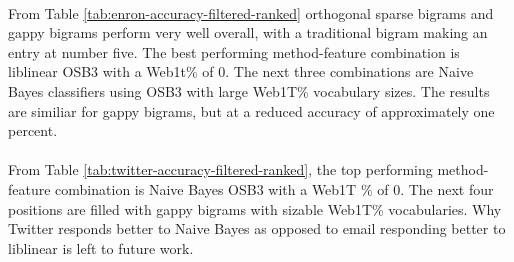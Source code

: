 	
	
	\paragraph*{} From Table \ref{tab:enron-accuracy-filtered-ranked} orthogonal sparse bigrams and gappy bigrams perform very well overall, with a traditional bigram making an entry at number five.  The best performing method-feature combination is liblinear OSB3 with a Web1t\% of 0.  The next three combinations are Naive Bayes classifiers using OSB3 with large Web1T\% vocabulary sizes.  The results are similiar for gappy bigrams, but at a reduced accuracy of approximately one percent.
	
	\paragraph*{} From Table \ref{tab:twitter-accuracy-filtered-ranked}, the top performing method-feature combination is Naive Bayes OSB3 with a Web1T \% of 0.  The next four positions are filled with gappy bigrams with sizable Web1T\% vocabularies.  Why Twitter responds better to Naive Bayes as opposed to email responding better to liblinear is left to future work.
	
